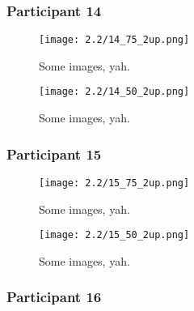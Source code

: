 \clearpage

\subsubsection{Participant 14}

\begin{figure}[h]
	\begin{center}
	\texttt{[image: 2.2/14\_75\_2up.png]}
	\caption{Some images, yah.}
	\end{center}
\end{figure}

\clearpage

\begin{figure}[h]
	\begin{center}
	\texttt{[image: 2.2/14\_50\_2up.png]}
	\caption{Some images, yah.}
	\end{center}
\end{figure}


\clearpage

\subsubsection{Participant 15}

\begin{figure}[h]
	\begin{center}
	\texttt{[image: 2.2/15\_75\_2up.png]}
	\caption{Some images, yah.}
	\end{center}
\end{figure}

\clearpage

\begin{figure}[h]
	\begin{center}
	\texttt{[image: 2.2/15\_50\_2up.png]}
	\caption{Some images, yah.}
	\end{center}
\end{figure}


\clearpage

\subsubsection{Participant 16}

